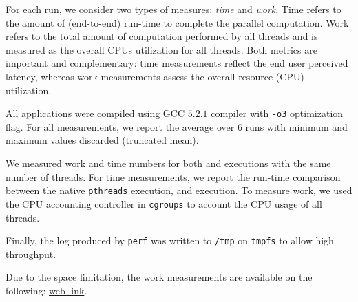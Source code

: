   For each run, we consider two types of measures: \emph{time} and
 {\em work}.  Time refers to the amount of (end-to-end)
run-time to complete the parallel computation.  Work refers to the total amount of
computation performed by all threads and is measured as the overall CPUs utilization for all threads. 
Both metrics are important
and complementary: time measurements reflect the end user perceived latency,
whereas work measurements assess the overall resource (CPU) utilization.


 All applications were compiled using
GCC $5.2.1$ compiler with {\tt -o3} optimization flag. For all
measurements, we report the average over $6$ runs with minimum and maximum values
discarded (truncated mean).

 We measured work and time numbers for both \pthreads and \projecttitle executions with the same number of threads. For time measurements, we report the run-time comparison between the native {\tt pthreads} execution, and \projecttitle execution.   To measure work, we used the CPU accounting controller in {\tt cgroups} to account the CPU usage of all threads. 

Finally, the log produced by
{\tt perf} was written to {\tt /tmp} on {\tt tmpfs} to allow high throughput.


   Due to the space limitation, the work measurements are available on the following: \href{https://mic92.github.io/inspector/index.html}{web-link}.




